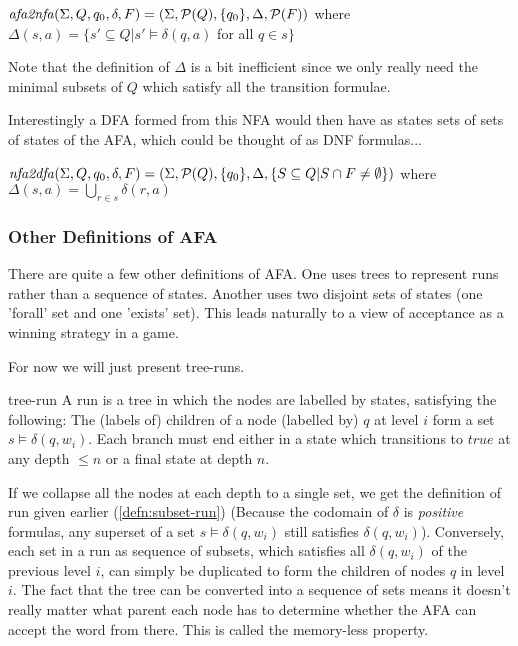 $\mathit{afa2nfa} (\Sigma, Q, q_0, \delta, F) = (\Sigma,\mathcal{P}(Q), \{q_0\}, \Delta, \mathcal{P}(F)) $ where \\ $\Delta(s, a) = \{ s' \subseteq Q | s' \models \delta(q,a)$ for all $q \in s \}$

Note that the definition of $\Delta$ is a bit inefficient since we only really need the minimal subsets of $Q$ which satisfy all the transition formulae.

Interestingly a DFA formed from this NFA would then have as states sets of sets of states of the AFA, which could be thought of as DNF formulas...

$\mathit{nfa2dfa} (\Sigma, Q, q_0, \delta, F) = (\Sigma,\mathcal{P}(Q), \{q_0\}, \Delta, \{S \subseteq Q | S \cap F \neq \emptyset\}) $ where \\ $\Delta(s, a) = \bigcup_{r \in s} \delta(r,a)$

\subsubsection{Other Definitions of AFA}

There are quite a few other definitions of AFA. One uses trees to represent runs rather than a sequence of states. Another uses two disjoint sets of states (one 'forall' set and one 'exists' set). This leads naturally to a view of acceptance as a winning strategy in a game.

For now we will just present tree-runs.

\begin{defnL}{tree-run}
    A run is a tree in which the nodes are labelled by states, satisfying the following:
           {The (labels of) children of a node (labelled by) $q$ at level $i$ form a set $s \models \delta(q,w_i)$.}
           {Each branch must end either in a state which transitions to $true$ at any depth $\leq n$ or a final state at depth $n$.}
\end{defnL}
If we collapse all the nodes at each depth to a single set, we get the definition of run given earlier (\ref{defn:subset-run}) (Because the codomain of $\delta$ is \textit{positive} formulas, any superset of a set $s \models \delta(q,w_i)$ still satisfies $\delta(q,w_i)$). Conversely, each set in a run as sequence of subsets, which satisfies all $\delta(q,w_i)$ of the previous level $i$, can simply be duplicated to form the children of nodes $q$ in level $i$. The fact that the tree can be converted into a sequence of sets means it doesn't really matter what parent each node has to determine whether the AFA can accept the word from there. This is called the memory-less property.

